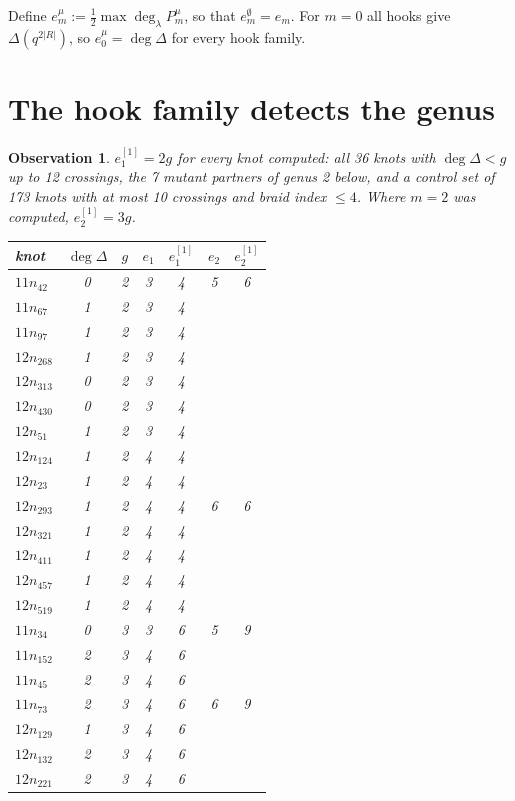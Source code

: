 \documentclass[11pt]{article}
\newtheorem{observation}{Observation}
\theoremstyle{remark}
\begin{document}
\noindent Define $e^\mu_m:=\tfrac12\max\deg_\lambda P^\mu_m$, so that $e^\emptyset_m=e_m$.  For $m=0$
all hooks give $\Delta(q^{2|R|})$, so $e^\mu_0=\deg\Delta$ for every hook family.

\section{The hook family detects the genus}

\begin{observation}\label{obs:hook}
$e^{[1]}_1=2g$ for every knot computed: all 36 knots with $\deg\Delta<g$ up to 12 crossings, the 7 mutant partners of genus 2 below, and a control set of
173 knots with at most 10 crossings and braid index $\le4$.  Where $m=2$ was computed, $e^{[1]}_2=3g$.
\begin{center}
\begin{tabular}{lcc|cc|cc}
\toprule
knot & $\deg\Delta$ & $g$ & $e_1$ & $e^{[1]}_1$ & $e_2$ & $e^{[1]}_2$\\
\midrule
$11n_{42}$ & 0 & 2 & 3 & 4 & 5 & 6\\
$11n_{67}$ & 1 & 2 & 3 & 4 &  & \\
$11n_{97}$ & 1 & 2 & 3 & 4 &  & \\
$12n_{268}$ & 1 & 2 & 3 & 4 &  & \\
$12n_{313}$ & 0 & 2 & 3 & 4 &  & \\
$12n_{430}$ & 0 & 2 & 3 & 4 &  & \\
$12n_{51}$ & 1 & 2 & 3 & 4 &  & \\
$12n_{124}$ & 1 & 2 & 4 & 4 &  & \\
$12n_{23}$ & 1 & 2 & 4 & 4 &  & \\
$12n_{293}$ & 1 & 2 & 4 & 4 & 6 & 6\\
$12n_{321}$ & 1 & 2 & 4 & 4 &  & \\
$12n_{411}$ & 1 & 2 & 4 & 4 &  & \\
$12n_{457}$ & 1 & 2 & 4 & 4 &  & \\
$12n_{519}$ & 1 & 2 & 4 & 4 &  & \\
$11n_{34}$ & 0 & 3 & 3 & 6 & 5 & 9\\
$11n_{152}$ & 2 & 3 & 4 & 6 &  & \\
$11n_{45}$ & 2 & 3 & 4 & 6 &  & \\
$11n_{73}$ & 2 & 3 & 4 & 6 & 6 & 9\\
$12n_{129}$ & 1 & 3 & 4 & 6 &  & \\
$12n_{132}$ & 2 & 3 & 4 & 6 &  & \\
$12n_{221}$ & 2 & 3 & 4 & 6 &  & \\

\end{tabular}
\end{center}
\end{observation}
\end{document}
